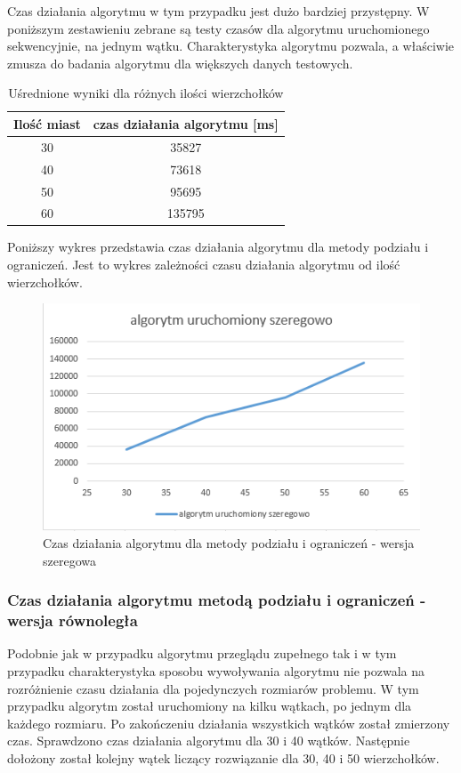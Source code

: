 \documentclass{article}
\begin{document}
		Czas działania algorytmu w tym przypadku jest dużo bardziej przystępny. W poniższym zestawieniu zebrane są testy czasów dla algorytmu uruchomionego sekwencyjnie, na jednym wątku. Charakterystyka algorytmu pozwala, a właściwie zmusza do badania algorytmu dla większych danych testowych.
	\begin{table}[H]
		\centering
		\caption{Uśrednione wyniki dla różnych ilości wierzchołków}
		\begin{tabular}{|c|c|}
			
			\hline Ilość miast  & czas działania algorytmu [ms] \\ 
			\hline  30& 35827 \\ 
			\hline  40& 73618 \\ 
			\hline  50& 95695\\ 
			\hline  60& 135795\\ 
			\hline 
		\end{tabular} 
	\end{table}
	
	Poniższy wykres przedstawia czas działania algorytmu dla metody podziału i ograniczeń. Jest to wykres zależności czasu działania algorytmu od ilość wierzchołków.

	\begin{figure}[H]
		\centering
		\includegraphics[width=0.9\linewidth]{bbS}
		\caption{ Czas działania algorytmu dla metody podziału i ograniczeń - wersja szeregowa }
	\end{figure}
	

	
	\subsubsection{Czas działania algorytmu metodą podziału i ograniczeń  - wersja równoległa}
	
	Podobnie jak w przypadku algorytmu przeglądu zupełnego tak i w tym przypadku charakterystyka sposobu wywoływania algorytmu nie pozwala na rozróżnienie czasu działania dla pojedynczych rozmiarów problemu. W tym przypadku algorytm został uruchomiony na kilku wątkach, po jednym dla każdego rozmiaru. Po zakończeniu działania wszystkich wątków został zmierzony czas. Sprawdzono czas działania algorytmu dla 30 i 40 wątków. Następnie dołożony został kolejny wątek liczący rozwiązanie dla 30, 40 i 50 wierzchołków.
		\\
\end{document}
